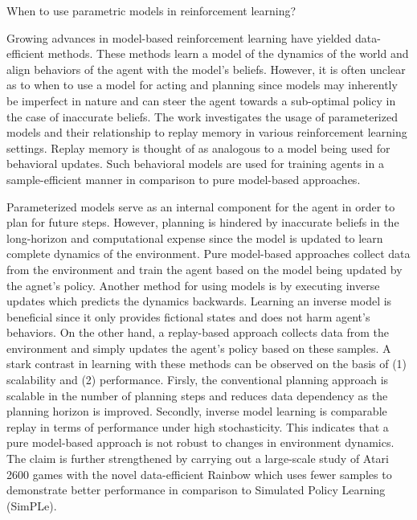 \documentclass[10pt,letterpaper]{article}
\begin{document}
\begin{center}
  \large{ When to use parametric models in reinforcement learning?}
\end{center}

Growing advances in model-based reinforcement learning have yielded data-efficient methods. These methods learn a model of the dynamics of the world and align behaviors of the agent with the model's beliefs. However, it is often unclear as to when to use a model for acting and planning since models may inherently be imperfect in nature and can steer the agent towards a sub-optimal policy in the case of inaccurate beliefs. The work investigates the usage of parameterized models and their relationship to replay memory in various reinforcement learning settings. Replay memory is thought of as analogous to a model being used for behavioral updates. Such behavioral models are used for training agents in a sample-efficient manner in comparison to pure model-based approaches.

Parameterized models serve as an internal component for the agent in order to plan for future steps. However, planning is hindered by inaccurate beliefs in the long-horizon and computational expense since the model is updated to learn complete dynamics of the environment. Pure model-based approaches collect data from the environment and train the agent based on the model being updated by the agnet's policy. Another method for using models is by executing inverse updates which predicts the dynamics backwards. Learning an inverse model is beneficial since it only provides fictional states and does not harm agent's behaviors. On the other hand, a replay-based approach collects data from the environment and simply updates the agent's policy based on these samples. A stark contrast in learning with these methods can be observed on the basis of (1) scalability and (2) performance. Firsly, the conventional planning approach is scalable in the number of planning steps and reduces data dependency as the planning horizon is improved. Secondly, inverse model learning is comparable replay in terms of performance under high stochasticity. This indicates that a pure model-based approach is not robust to changes in environment dynamics. The claim is further strengthened by carrying out a large-scale study of Atari 2600 games with the novel data-efficient Rainbow which uses fewer samples to demonstrate better performance in comparison to Simulated Policy Learning (SimPLe). 
\end{document}
